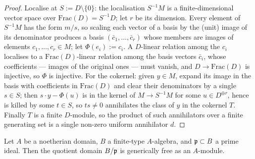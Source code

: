 \begin{proof}
  \leanok
Localise at \(S := D \setminus \{0\}\): the localisation \(S^{-1}M\) is a
  finite-dimensional vector space over \(\mathrm{Frac}(D) = S^{-1}D\); let
  \(r\) be its dimension.  Every element of \(S^{-1}M\) has the form
  \(m/s\), so scaling each vector of a basis by the (unit) image of its
  denominator produces a basis \((\bar c_1, \dots, \bar c_r)\) whose members
  are images of elements \(c_1, \dots, c_r \in M\); let
  \(\Phi(e_i) := c_i\).  A \(D\)-linear relation among the \(c_i\)
  localises to a \(\mathrm{Frac}(D)\)-linear relation among the basis
  vectors \(\bar c_i\), whose coefficients — images of the original ones —
  must vanish, and \(D \to \mathrm{Frac}(D)\) is injective, so \(\Phi\) is
  injective.  For the cokernel: given \(y \in M\), expand its image in the
  basis with coefficients in \(\mathrm{Frac}(D)\) and clear their
  denominators by a single \(s \in S\); then \(s \cdot y - \Phi(u)\) is in
  the kernel of \(M \to S^{-1}M\) for some \(u \in D^{\oplus r}\), hence is
  killed by some \(t \in S\), so \(ts \ne 0\) annihilates the class of
  \(y\) in the cokernel \(T\).  Finally \(T\) is a finite \(D\)-module, so
  the product of such annihilators over a finite generating set is a single
  non-zero uniform annihilator \(d\).
\end{proof}

\begin{lemma}\label{mk-lem:generically_free_domain_core}
  \leanok

  Let \(A\) be a noetherian domain, \(B\) a finite-type \(A\)-algebra, and
  \(\mathfrak{p} \subset B\) a prime ideal.  Then the quotient domain \(B/\mathfrak{p}\) is
  generically free as an \(A\)-module.
\end{lemma}

